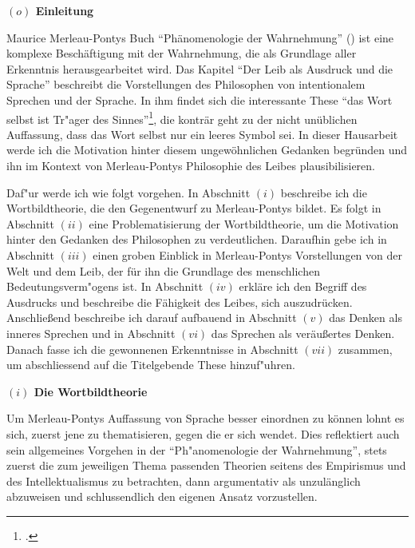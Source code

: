 \documentclass[a4paper, 12pt]{article}
\begin{document}
\begin{onehalfspace} 

\noindent\textbf{$(o)$ Einleitung}

\noindent Maurice Merleau-Pontys Buch "`Phänomenologie der Wahrnehmung"' (\Cite{merleau1966phanomenologie}) ist eine komplexe Beschäftigung mit der Wahrnehmung, die als Grundlage aller Erkenntnis herausgearbeitet wird. Das Kapitel "`Der Leib als Ausdruck und die Sprache"' beschreibt die Vorstellungen des Philosophen von intentionalem Sprechen und der Sprache. In ihm findet sich die interessante These "`das Wort selbst ist Tr"ager des Sinnes"'\footnote{\Cite[Siehe][S. 211]{merleau1966phanomenologie}.}, die konträr geht zu der nicht unüblichen Auffassung, dass das Wort selbst nur ein leeres Symbol sei. In dieser Hausarbeit werde ich die Motivation hinter diesem ungewöhnlichen Gedanken begründen und ihn im Kontext von Merleau-Pontys Philosophie des Leibes plausibilisieren. 

Daf"ur werde ich wie folgt vorgehen. In Abschnitt $(i)$ beschreibe ich die Wortbildtheorie, die den Gegenentwurf zu Merleau-Pontys bildet. Es folgt in Abschnitt $(ii)$ eine Problematisierung der Wortbildtheorie, um die Motivation hinter den Gedanken des Philosophen zu verdeutlichen. Daraufhin gebe ich in Abschnitt $(iii)$ einen groben Einblick in Merleau-Pontys Vorstellungen von der Welt und dem Leib, der für ihn die Grundlage des menschlichen Bedeutungsverm"ogens ist. In Abschnitt $(iv)$ erkläre ich den Begriff des Ausdrucks und beschreibe die Fähigkeit des Leibes, sich auszudrücken. Anschließend beschreibe ich darauf aufbauend in Abschnitt $(v)$ das Denken als inneres Sprechen und in Abschnitt $(vi)$ das Sprechen als veräußertes Denken. Danach fasse ich die gewonnenen Erkenntnisse in Abschnitt $(vii)$ zusammen, um abschliessend auf die Titelgebende These hinzuf"uhren.

\vspace{5mm}

\noindent\textbf{$(i)$ Die Wortbildtheorie}

\noindent Um Merleau-Pontys Auffassung von Sprache besser einordnen zu können lohnt es sich, zuerst jene zu thematisieren, gegen die er sich wendet. Dies reflektiert auch sein allgemeines Vorgehen in der "`Ph"anomenologie der Wahrnehmung"', stets zuerst die zum jeweiligen Thema passenden Theorien seitens des Empirismus und des Intellektualismus zu betrachten, dann argumentativ als unzulänglich abzuweisen und schlussendlich den eigenen Ansatz vorzustellen. 


\end{onehalfspace}
\end{document}
